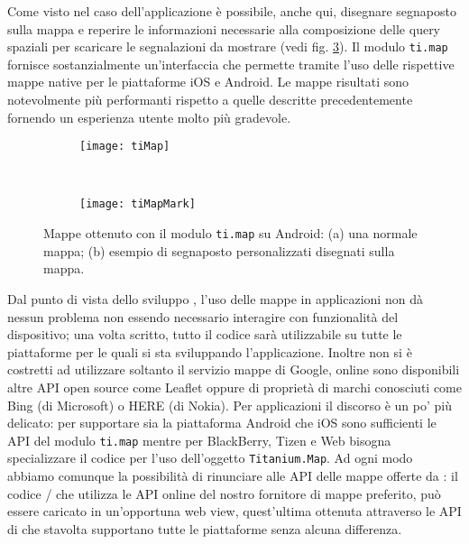 			Come visto nel caso dell'applicazione \pg{} è possibile, anche qui,
			disegnare segnaposto sulla mappa e reperire le informazioni
			necessarie alla composizione delle query spaziali per scaricare le
			segnalazioni da mostrare (vedi fig. \ref{fig:TiMaps}). Il modulo
			\texttt{ti.map} fornisce sostanzialmente un'interfaccia che permette
			tramite \js{} l'uso	delle rispettive mappe native per le piattaforme
			iOS e Android. Le mappe risultati sono notevolmente più performanti
			rispetto a quelle descritte precedentemente fornendo un esperienza
			utente molto più gradevole.
			\begin{figure}[h]
				\centering
				\begin{subfigure}[b]{0.485\textwidth}
					\texttt{[image: tiMap]}
					\caption{}
					\label{fig:tiMap}
				\end{subfigure}
				~
				\begin{subfigure}[b]{0.485\textwidth}
					\texttt{[image: tiMapMark]}
					\caption{}
					\label{fig:tiMapMark}
				\end{subfigure}
				\caption{
					Mappe ottenuto con il modulo \texttt{ti.map} su Android: (a)
					una normale mappa; (b) esempio di segnaposto personalizzati
					disegnati sulla mappa.
				}
				\label{fig:TiMaps}
			\end{figure}
			
			Dal punto di vista dello sviluppo \crossplat{}, l'uso delle mappe in
			applicazioni \pg{} non dà nessun problema non essendo necessario
			interagire con funzionalità del dispositivo; una volta scritto,
			tutto il codice sarà utilizzabile su tutte le piattaforme per le
			quali si sta sviluppando l'applicazione. Inoltre non si è
			costretti ad utilizzare soltanto il servizio mappe di Google, online
			sono disponibili altre API \js{} open source come Leaflet oppure
			di proprietà di marchi conosciuti come Bing (di Microsoft) o HERE
			(di Nokia). Per applicazioni \tisdk{} il discorso è un po' più
			delicato: per supportare sia la piattaforma Android che iOS sono
			sufficienti le API del modulo \texttt{ti.map} mentre per BlackBerry,
			Tizen e Web bisogna specializzare il codice per l'uso dell'oggetto
			\texttt{Titanium.Map}. Ad ogni modo abbiamo comunque la possibilità
			di rinunciare alle API delle mappe offerte da \tisdk{}: il codice
			\js{}/\html{} che utilizza le API online del nostro fornitore di
			mappe preferito, può essere caricato in un'opportuna web view,
			quest'ultima ottenuta attraverso le API di \tisdk{} che stavolta
			supportano tutte le piattaforme senza alcuna differenza.
			
